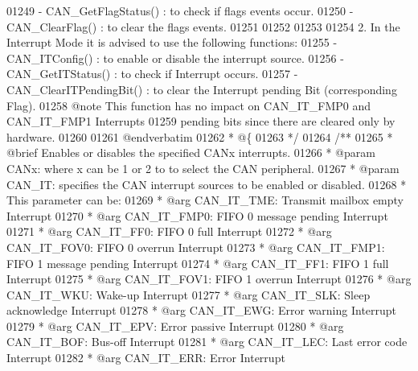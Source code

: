 \begin{DoxyCode}
01249 \textcolor{comment}{      - CAN\_GetFlagStatus() : to check if flags events occur. }
01250 \textcolor{comment}{      - CAN\_ClearFlag()     : to clear the flags events.}
01251 \textcolor{comment}{  }
01252 \textcolor{comment}{}
01253 \textcolor{comment}{  }
01254 \textcolor{comment}{  2.  In the Interrupt Mode it is advised to use the following functions:}
01255 \textcolor{comment}{      - CAN\_ITConfig()       : to enable or disable the interrupt source.}
01256 \textcolor{comment}{      - CAN\_GetITStatus()    : to check if Interrupt occurs.}
01257 \textcolor{comment}{      - CAN\_ClearITPendingBit() : to clear the Interrupt pending Bit (corresponding Flag).}
01258 \textcolor{comment}{      @note  This function has no impact on CAN\_IT\_FMP0 and CAN\_IT\_FMP1 Interrupts }
01259 \textcolor{comment}{             pending bits since there are cleared only by hardware. }
01260 \textcolor{comment}{  }
01261 \textcolor{comment}{@endverbatim}
01262 \textcolor{comment}{  * @\{}
01263 \textcolor{comment}{  */}
01264 \textcolor{comment}{/**}
01265 \textcolor{comment}{  * @brief  Enables or disables the specified CANx interrupts.}
01266 \textcolor{comment}{  * @param  CANx: where x can be 1 or 2 to to select the CAN peripheral.}
01267 \textcolor{comment}{  * @param  CAN\_IT: specifies the CAN interrupt sources to be enabled or disabled.}
01268 \textcolor{comment}{  *          This parameter can be: }
01269 \textcolor{comment}{  *            @arg CAN\_IT\_TME: Transmit mailbox empty Interrupt }
01270 \textcolor{comment}{  *            @arg CAN\_IT\_FMP0: FIFO 0 message pending Interrupt }
01271 \textcolor{comment}{  *            @arg CAN\_IT\_FF0: FIFO 0 full Interrupt}
01272 \textcolor{comment}{  *            @arg CAN\_IT\_FOV0: FIFO 0 overrun Interrupt}
01273 \textcolor{comment}{  *            @arg CAN\_IT\_FMP1: FIFO 1 message pending Interrupt }
01274 \textcolor{comment}{  *            @arg CAN\_IT\_FF1: FIFO 1 full Interrupt}
01275 \textcolor{comment}{  *            @arg CAN\_IT\_FOV1: FIFO 1 overrun Interrupt}
01276 \textcolor{comment}{  *            @arg CAN\_IT\_WKU: Wake-up Interrupt}
01277 \textcolor{comment}{  *            @arg CAN\_IT\_SLK: Sleep acknowledge Interrupt  }
01278 \textcolor{comment}{  *            @arg CAN\_IT\_EWG: Error warning Interrupt}
01279 \textcolor{comment}{  *            @arg CAN\_IT\_EPV: Error passive Interrupt}
01280 \textcolor{comment}{  *            @arg CAN\_IT\_BOF: Bus-off Interrupt  }
01281 \textcolor{comment}{  *            @arg CAN\_IT\_LEC: Last error code Interrupt}
01282 \textcolor{comment}{  *            @arg CAN\_IT\_ERR: Error Interrupt}

\end{DoxyCode}
